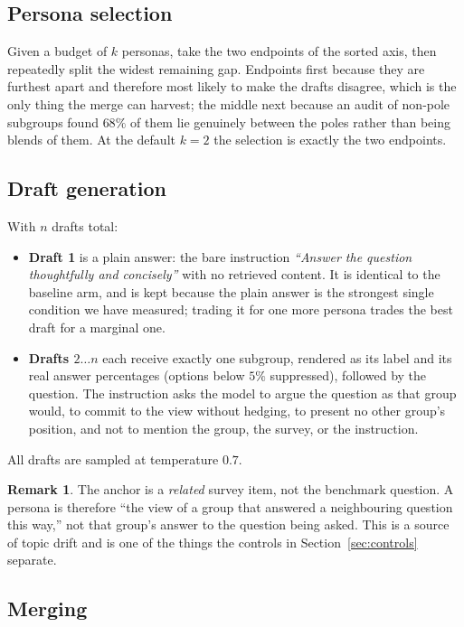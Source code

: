 \documentclass[11pt]{article}
\theoremstyle{definition}
\newtheorem{remark}{Remark}
\begin{document}
\subsection{Persona selection}

Given a budget of $k$ personas, take the two endpoints of the sorted axis, then
repeatedly split the widest remaining gap. Endpoints first because they are
furthest apart and therefore most likely to make the drafts disagree, which is
the only thing the merge can harvest; the middle next because an audit of
non-pole subgroups found $68\%$ of them lie genuinely between the poles rather
than being blends of them. At the default $k = 2$ the selection is exactly the
two endpoints.

\subsection{Draft generation}

With $n$ drafts total:

\begin{itemize}
\item \textbf{Draft 1} is a plain answer: the bare instruction \emph{``Answer
the question thoughtfully and concisely''} with no retrieved content. It is
identical to the baseline arm, and is kept because the plain answer is the
strongest single condition we have measured; trading it for one more persona
trades the best draft for a marginal one.
\item \textbf{Drafts $2 \ldots n$} each receive exactly one subgroup, rendered
as its label and its real answer percentages (options below $5\%$ suppressed),
followed by the question. The instruction asks the model to argue the question
as that group would, to commit to the view without hedging, to present no other
group's position, and not to mention the group, the survey, or the instruction.
\end{itemize}

All drafts are sampled at temperature $0.7$.

\begin{remark}
The anchor is a \emph{related} survey item, not the benchmark question. A
persona is therefore ``the view of a group that answered a neighbouring question
this way,'' not that group's answer to the question being asked. This is a
source of topic drift and is one of the things the controls in
Section~\ref{sec:controls} separate.
\end{remark}

\subsection{Merging}
\end{document}
